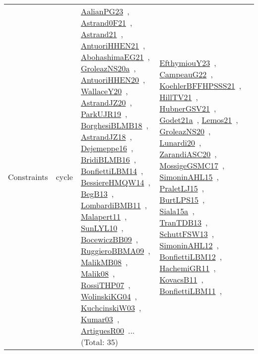 {\begin{longtable}{lp{3cm}>{\raggedright\arraybackslash}p{6cm}>{\raggedright\arraybackslash}p{6cm}>{\raggedright\arraybackslash}p{8cm}}
Constraints & cycle & \href{works/AalianPG23.pdf}{AalianPG23}~\cite{AalianPG23}, \href{works/Astrand0F21.pdf}{Astrand0F21}~\cite{Astrand0F21}, \href{works/Astrand21.pdf}{Astrand21}~\cite{Astrand21}, \href{works/AntuoriHHEN21.pdf}{AntuoriHHEN21}~\cite{AntuoriHHEN21}, \href{works/AbohashimaEG21.pdf}{AbohashimaEG21}~\cite{AbohashimaEG21}, \href{works/GroleazNS20a.pdf}{GroleazNS20a}~\cite{GroleazNS20a}, \href{works/AntuoriHHEN20.pdf}{AntuoriHHEN20}~\cite{AntuoriHHEN20}, \href{works/WallaceY20.pdf}{WallaceY20}~\cite{WallaceY20}, \href{works/AstrandJZ20.pdf}{AstrandJZ20}~\cite{AstrandJZ20}, \href{works/ParkUJR19.pdf}{ParkUJR19}~\cite{ParkUJR19}, \href{works/BorghesiBLMB18.pdf}{BorghesiBLMB18}~\cite{BorghesiBLMB18}, \href{works/AstrandJZ18.pdf}{AstrandJZ18}~\cite{AstrandJZ18}, \href{works/Dejemeppe16.pdf}{Dejemeppe16}~\cite{Dejemeppe16}, \href{works/BridiBLMB16.pdf}{BridiBLMB16}~\cite{BridiBLMB16}, \href{works/BonfiettiLBM14.pdf}{BonfiettiLBM14}~\cite{BonfiettiLBM14}, \href{works/BessiereHMQW14.pdf}{BessiereHMQW14}~\cite{BessiereHMQW14}, \href{works/BegB13.pdf}{BegB13}~\cite{BegB13}, \href{works/LombardiBMB11.pdf}{LombardiBMB11}~\cite{LombardiBMB11}, \href{works/Malapert11.pdf}{Malapert11}~\cite{Malapert11}, \href{works/SunLYL10.pdf}{SunLYL10}~\cite{SunLYL10}, \href{works/BocewiczBB09.pdf}{BocewiczBB09}~\cite{BocewiczBB09}, \href{works/RuggieroBBMA09.pdf}{RuggieroBBMA09}~\cite{RuggieroBBMA09}, \href{works/MalikMB08.pdf}{MalikMB08}~\cite{MalikMB08}, \href{works/Malik08.pdf}{Malik08}~\cite{Malik08}, \href{works/RossiTHP07.pdf}{RossiTHP07}~\cite{RossiTHP07}, \href{works/WolinskiKG04.pdf}{WolinskiKG04}~\cite{WolinskiKG04}, \href{works/KuchcinskiW03.pdf}{KuchcinskiW03}~\cite{KuchcinskiW03}, \href{works/Kumar03.pdf}{Kumar03}~\cite{Kumar03}, \href{works/ArtiguesR00.pdf}{ArtiguesR00}~\cite{ArtiguesR00}... (Total: 35) & \href{works/EfthymiouY23.pdf}{EfthymiouY23}~\cite{EfthymiouY23}, \href{works/CampeauG22.pdf}{CampeauG22}~\cite{CampeauG22}, \href{works/KoehlerBFFHPSSS21.pdf}{KoehlerBFFHPSSS21}~\cite{KoehlerBFFHPSSS21}, \href{works/HillTV21.pdf}{HillTV21}~\cite{HillTV21}, \href{works/HubnerGSV21.pdf}{HubnerGSV21}~\cite{HubnerGSV21}, \href{works/Godet21a.pdf}{Godet21a}~\cite{Godet21a}, \href{works/Lemos21.pdf}{Lemos21}~\cite{Lemos21}, \href{works/GroleazNS20.pdf}{GroleazNS20}~\cite{GroleazNS20}, \href{works/Lunardi20.pdf}{Lunardi20}~\cite{Lunardi20}, \href{works/ZarandiASC20.pdf}{ZarandiASC20}~\cite{ZarandiASC20}, \href{works/MossigeGSMC17.pdf}{MossigeGSMC17}~\cite{MossigeGSMC17}, \href{works/SimoninAHL15.pdf}{SimoninAHL15}~\cite{SimoninAHL15}, \href{works/PraletLJ15.pdf}{PraletLJ15}~\cite{PraletLJ15}, \href{works/BurtLPS15.pdf}{BurtLPS15}~\cite{BurtLPS15}, \href{works/Siala15a.pdf}{Siala15a}~\cite{Siala15a}, \href{works/TranTDB13.pdf}{TranTDB13}~\cite{TranTDB13}, \href{works/SchuttFSW13.pdf}{SchuttFSW13}~\cite{SchuttFSW13}, \href{works/SimoninAHL12.pdf}{SimoninAHL12}~\cite{SimoninAHL12}, \href{works/BonfiettiLBM12.pdf}{BonfiettiLBM12}~\cite{BonfiettiLBM12}, \href{works/HachemiGR11.pdf}{HachemiGR11}~\cite{HachemiGR11}, \href{works/KovacsB11.pdf}{KovacsB11}~\cite{KovacsB11}, \href{works/BonfiettiLBM11.pdf}{BonfiettiLBM11}~\cite{BonfiettiLBM11}, 
\end{longtable}}
